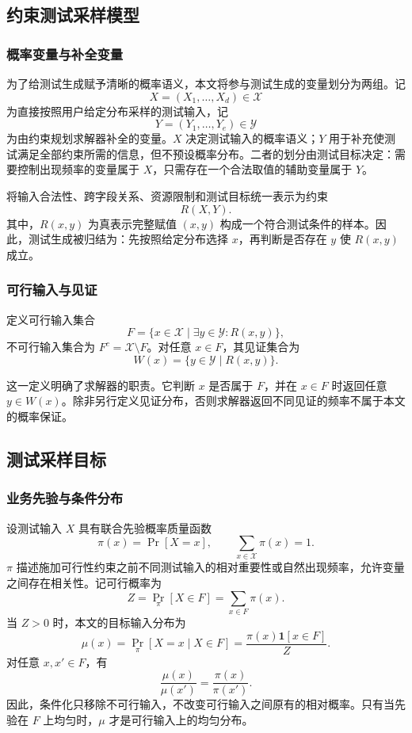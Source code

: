 \documentclass[UTF8, fontset=none, a4paper, 12pt]{ctexart}
\newcommand{\InputSpace}{\mathcal{X}}
\newcommand{\WitnessSpace}{\mathcal{Y}}
\begin{document}
\subsection{约束测试采样模型}

\subsubsection{概率变量与补全变量}

为了给测试生成赋予清晰的概率语义，本文将参与测试生成的变量划分为两组。记
\[
  X=(X_1,\ldots,X_d)\in\InputSpace
\]
为直接按照用户给定分布采样的测试输入，记
\[
  Y=(Y_1,\ldots,Y_e)\in\WitnessSpace
\]
为由约束规划求解器补全的变量。$X$ 决定测试输入的概率语义；$Y$ 用于补充使测试满足全部约束所需的信息，但不预设概率分布。二者的划分由测试目标决定：需要控制出现频率的变量属于 $X$，只需存在一个合法取值的辅助变量属于 $Y$。

将输入合法性、跨字段关系、资源限制和测试目标统一表示为约束
\[
  R(X,Y).
\]
其中，$R(x,y)$ 为真表示完整赋值 $(x,y)$ 构成一个符合测试条件的样本。因此，测试生成被归结为：先按照给定分布选择 $x$，再判断是否存在 $y$ 使 $R(x,y)$ 成立。

\subsubsection{可行输入与见证}

定义可行输入集合
\[
  F=\{x\in\InputSpace\mid
  \exists y\in\WitnessSpace:R(x,y)\},
\]
不可行输入集合为 $F^{c}=\InputSpace\setminus F$。对任意 $x\in F$，其见证集合为
\[
  W(x)=\{y\in\WitnessSpace\mid R(x,y)\}.
\]

这一定义明确了求解器的职责。它判断 $x$ 是否属于 $F$，并在 $x\in F$ 时返回任意 $y\in W(x)$。除非另行定义见证分布，否则求解器返回不同见证的频率不属于本文的概率保证。

\subsection{测试采样目标}

\subsubsection{业务先验与条件分布}

设测试输入 $X$ 具有联合先验概率质量函数
\[
  \pi(x)=\Pr[X=x],
  \qquad
  \sum_{x\in\InputSpace}\pi(x)=1.
\]
$\pi$ 描述施加可行性约束之前不同测试输入的相对重要性或自然出现频率，允许变量之间存在相关性。记可行概率为
\[
  Z=\Pr_{\pi}[X\in F]
   =\sum_{x\in F}\pi(x).
\]
当 $Z>0$ 时，本文的目标输入分布为
\[
  \mu(x)
  =\Pr_{\pi}[X=x\mid X\in F]
  =\frac{\pi(x)\mathbf{1}[x\in F]}{Z}.
\]
对任意 $x,x'\in F$，有
\[
  \frac{\mu(x)}{\mu(x')}
  =\frac{\pi(x)}{\pi(x')}.
\]
因此，条件化只移除不可行输入，不改变可行输入之间原有的相对概率。只有当先验在 $F$ 上均匀时，$\mu$ 才是可行输入上的均匀分布。
\end{document}
